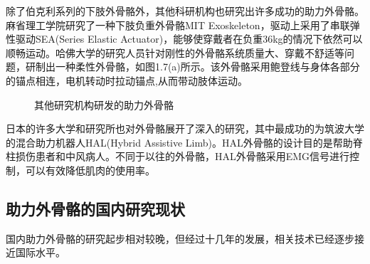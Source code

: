 除了伯克利系列的下肢外骨骼外，其他科研机构也研究出许多成功的助力外骨骼。麻省理工学院研究了一种下肢负重外骨骼MIT Exoskeleton\cite{p11}，驱动上采用了串联弹性驱动SEA(Series Elastic Actuator)，能够使穿戴者在负重36kg的情况下依然可以顺畅运动。哈佛大学的研究人员针对刚性的外骨骼系统质量大、穿戴不舒适等问题，研制出一种柔性外骨骼\cite{p12}，如图1.7(a)所示。该外骨骼采用鲍登线与身体各部分的锚点相连，电机转动时拉动锚点,从而带动肢体运动。

\begin{figure}[htb]
    \quad
    \caption{其他研究机构研发的助力外骨骼}
    \label{fig:subfigss}
\end{figure}

日本的许多大学和研究所也对外骨骼展开了深入的研究，其中最成功的为筑波大学的混合助力机器人HAL\cite{p13}(Hybrid Assistive Limb)。HAL外骨骼的设计目的是帮助脊柱损伤患者和中风病人。不同于以往的外骨骼，HAL外骨骼采用EMG信号进行控制，可以有效降低肌肉的使用率。

\subsection{助力外骨骼的国内研究现状}

国内助力外骨骼的研究起步相对较晚，但经过十几年的发展，相关技术已经逐步接近国际水平。

